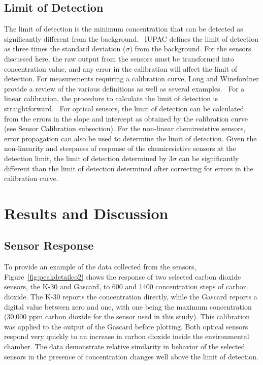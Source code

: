 \documentclass[times]{joehreview}
\begin{document}
	\subsection*{Limit of Detection}
	\label{sec:method_detection}
	The limit of detection is the minimum concentration that can be detected as significantly different from the background.~\cite{long_limit_1983,currie_detection:_1997,mocak_j._statistical_2009}  IUPAC defines the limit of detection as three times the standard deviation ($\sigma$) from the background.  For the sensors discussed here, the raw output from the sensors must be transformed into concentration value, and any error in the calibration will affect the limit of detection. For measurements requiring a calibration curve, Long and Winefordner provide a review of the various definitions as well as several examples.~\cite{long_limit_1983}  For a linear calibration, the procedure to calculate the limit of detection is straightforward.~\cite{long_limit_1983}  For optical sensors, the limit of detection can be calculated from the errors in the slope and intercept as obtained by the calibration curve (see Sensor Calibration subsection).  For the non-linear chemiresistive sensors, error propagation can also be used to determine the limit of detection. Given the non-linearity and steepness of response of the chemiresistive sensors at the detection limit, the limit of detection determined by $3\sigma$ can be significantly different than the limit of detection determined after correcting for errors in the calibration curve.
	
	\section*{Results and Discussion}
	
	\subsection*{Sensor Response}
	\label{sec:time}
	
	To provide an example of the data collected from the sensors, Figure~\ref{fig:peakdetailco2} shows the response of two selected carbon dioxide sensors, the K-30 and Gascard, to 600 and 1400 concentration steps of carbon dioxide.  The K-30 reports the concentration directly, while the Gascard reports a digital value between zero and one, with one being the maximum concentration (30,000 ppm carbon dioxide for the sensor used in this study).  This calibration was applied to the output of the Gascard before plotting. Both optical sensors respond very quickly to an increase in carbon dioxide inside the environmental chamber.  The data demonstrate relative similarity in behavior of the selected sensors in the presence of concentration changes well above the limit of detection.  
	
\end{document}
